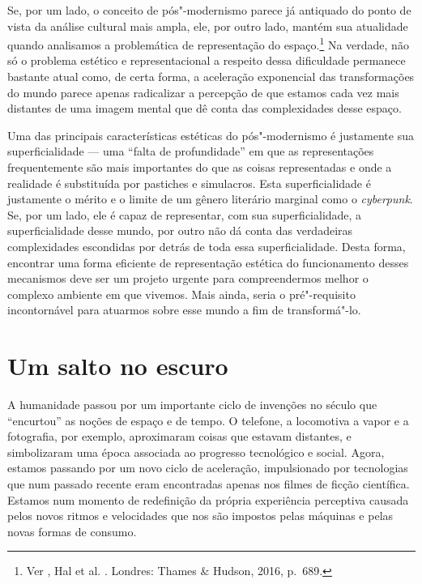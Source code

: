 Se, por um lado, o conceito de pós"-modernismo parece já antiquado do
ponto de vista da análise cultural mais ampla, ele, por outro lado,
mantém sua atualidade quando analisamos a problemática de representação
do espaço.\footnote{Ver , Hal et al. {}. Londres: Thames \& Hudson,
  2016, p.~689.} Na verdade, não só o problema estético e
representacional a respeito dessa dificuldade permanece bastante atual
como, de certa forma, a aceleração exponencial das transformações do
mundo parece apenas radicalizar a percepção de que estamos cada vez mais
distantes de uma imagem mental que dê conta das complexidades desse
espaço.

Uma das principais características estéticas do pós"-modernismo é
justamente sua superficialidade --- uma ``falta de profundidade'' em que as
representações frequentemente são mais importantes do que as coisas
representadas e onde a realidade é substituída por pastiches e
simulacros. Esta
superficialidade é justamente o mérito e o limite de um gênero literário
marginal como o \emph{cyberpunk}. Se, por um lado, ele é capaz de
representar, com sua superficialidade, a superficialidade desse mundo,
por outro não dá conta das verdadeiras complexidades
escondidas por detrás de toda essa superficialidade. Desta forma,
encontrar uma forma eficiente de representação estética do funcionamento
desses mecanismos deve ser um projeto urgente para compreendermos melhor
o complexo ambiente em que vivemos. Mais ainda, seria o pré"-requisito
incontornável para atuarmos sobre esse mundo a fim de transformá"-lo.

\chapter{Um salto no escuro}

A humanidade passou por um importante ciclo de invenções no século 
que ``encurtou'' as noções de espaço e de tempo. O telefone, a
locomotiva a vapor e a fotografia, por exemplo, aproximaram coisas que
estavam distantes, e simbolizaram uma época associada ao progresso
tecnológico e social. Agora, estamos passando por um novo ciclo de
aceleração, impulsionado por tecnologias que num passado recente eram
encontradas apenas nos filmes de ficção científica. Estamos num momento
de redefinição da própria experiência perceptiva causada pelos novos
ritmos e velocidades que nos são impostos pelas máquinas e pelas novas
formas de consumo.

